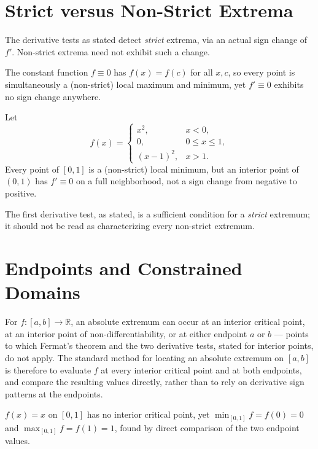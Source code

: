 \documentclass{essay}
\begin{document}
\section{Strict versus Non-Strict Extrema}

The derivative tests as stated detect \emph{strict} extrema, via an actual
sign change of \(f'\). Non-strict extrema need not exhibit such a change.

\begin{example}
The constant function \(f\equiv0\) has \(f(x)=f(c)\) for all \(x,c\), so
every point is simultaneously a (non-strict) local maximum and minimum, yet
\(f'\equiv0\) exhibits no sign change anywhere.
\end{example}

\begin{example}
Let
\[
f(x)=\begin{cases} x^2, & x<0,\\ 0, & 0\leq x\leq1,\\ (x-1)^2,& x>1.\end{cases}
\]
Every point of \([0,1]\) is a (non-strict) local minimum, but an interior
point of \((0,1)\) has \(f'\equiv0\) on a full neighborhood, not a sign
change from negative to positive.
\end{example}

The first derivative test, as stated, is a sufficient condition for a
\emph{strict} extremum; it should not be read as characterizing every
non-strict extremum.

\section{Endpoints and Constrained Domains}

For \(f:[a,b]\to\mathbb{R}\), an absolute extremum can occur at an interior
critical point, at an interior point of non-differentiability, or at either
endpoint \(a\) or \(b\) --- points to which Fermat's theorem and the two
derivative tests, stated for interior points, do not apply. The standard
method for locating an absolute extremum on \([a,b]\) is therefore to
evaluate \(f\) at every interior critical point and at both endpoints, and
compare the resulting values directly, rather than to rely on derivative
sign patterns at the endpoints.

\begin{example}
\(f(x)=x\) on \([0,1]\) has no interior critical point, yet
\(\min_{[0,1]}f=f(0)=0\) and \(\max_{[0,1]}f=f(1)=1\), found by direct
comparison of the two endpoint values.
\end{example}
\end{document}
